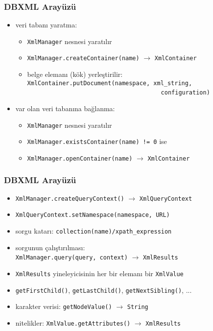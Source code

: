 \documentclass[dvipsnames]{beamer}
\theoremstyle{definition}
\theoremstyle{example}
\theoremstyle{plain}
\begin{document}
\begin{frame}
  \frametitle{DBXML Arayüzü}

  \begin{itemize}
    \item veri tabanı yaratma:\\
    \begin{itemize}
      \item \lstinline!XmlManager! nesnesi yaratılır
      \item \lstinline!XmlManager.createContainer(name)!
        $\rightarrow$ \lstinline!XmlContainer!
      \item belge elemanı (kök) yerleştirilir:\\
        \lstinline!XmlContainer.putDocument(namespace, xml_string,!\\
        ~~~~~~~~~~~~~~~~~~~~~~~~~~~~~~~~~~~~~~~\lstinline!configuration)!
    \end{itemize}

    \pause
    \item var olan veri tabanına bağlanma:\\
    \begin{itemize}
      \item \lstinline!XmlManager! nesnesi yaratılır
      \item \lstinline?XmlManager.existsContainer(name) != 0? ise
      \item \lstinline!XmlManager.openContainer(name)!
        $\rightarrow$ \lstinline!XmlContainer!
    \end{itemize}
  \end{itemize}
\end{frame}

\begin{frame}
  \frametitle{DBXML Arayüzü}

  \begin{itemize}
    \item \lstinline!XmlManager.createQueryContext()!
      $\rightarrow$ \lstinline!XmlQueryContext!
    \item \lstinline!XmlQueryContext.setNamespace(namespace, URL)!

    \pause
    \item sorgu katarı: \lstinline!collection(name)/xpath_expression!
    \item sorgunun çalıştırılması:\\
      \lstinline!XmlManager.query(query, context)!
      $\rightarrow$ \lstinline!XmlResults!

    \pause
    \medskip
    \item \lstinline!XmlResults! yineleyicisinin her bir elemanı bir
      \lstinline!XmlValue!
    \item \lstinline!getFirstChild()!, \lstinline!getLastChild()!,
      \lstinline!getNextSibling()!, ...
    \item karakter verisi: \lstinline!getNodeValue()!
      $\rightarrow$ \lstinline!String!
    \item nitelikler:
      \lstinline!XmlValue.getAttributes()! $\rightarrow$ \lstinline!XmlResults!
  \end{itemize}
\end{frame}
\end{document}
